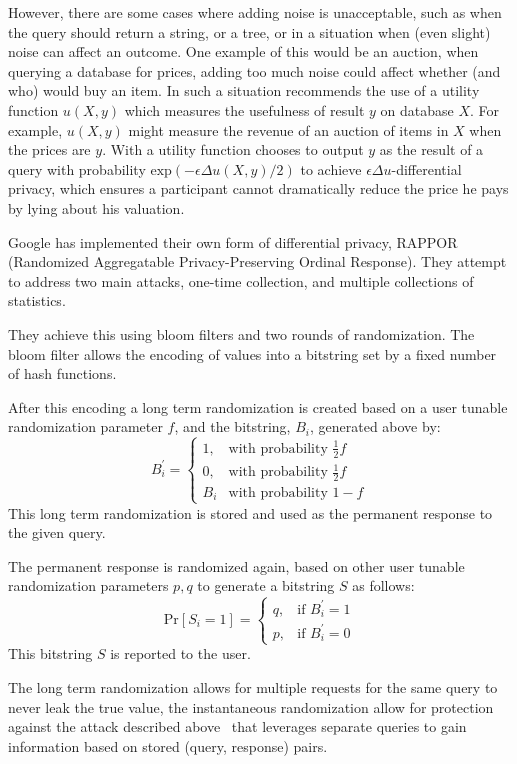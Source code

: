 However, there are some cases where adding noise is unacceptable, such as when
the query should return a string, or a tree, or in a situation when (even
slight) noise can affect an outcome. One example of this would be an auction,
when querying a database for prices, adding too much noise could affect whether
(and who) would buy an item. In such a situation \cite{mcsherry2007mechanism}
recommends the use of a utility function $u(X,y)$ which measures the usefulness
of result $y$ on database $X$. For example, $u(X,y)$ might measure the revenue
of an auction of items in $X$ when the prices are $y$. With a utility function
chooses to output $y$ as the result of a query with probability
$\text{exp}(-\epsilon \Delta u(X,y)/2)$ to achieve $\epsilon\Delta
u$-differential privacy, which ensures a participant cannot dramatically reduce
the price he pays by lying about his valuation.

Google has implemented their own form of differential privacy,
RAPPOR~\cite{erlingsson2014rappor} (Randomized Aggregatable Privacy-Preserving
Ordinal Response). They attempt to address two main attacks, one-time
collection, and multiple collections of statistics. 

They achieve this using bloom filters and two rounds of randomization. The bloom
filter allows the encoding of values into a bitstring set by a fixed number of
hash functions. 

After this encoding a long term randomization is created based
on a user tunable randomization parameter $f$, and the bitstring, $B_i$,
generated above by:
\[
    B^\prime_i = \begin{cases}
        1, & \mbox{with probability } \frac{1}{2} f\\
        0, & \mbox{with probability } \frac{1}{2} f\\
        B_i & \mbox{with probability } 1 - f
    \end{cases}
\]
This long term randomization is stored and used as the permanent response to the
given query.

The permanent response is randomized again, based on other user tunable
randomization parameters $p,q$ to generate a bitstring $S$ as follows:
\[
    \text{Pr}[S_i = 1] = \begin{cases}
        q, &\mbox{if } B^\prime_i = 1\\
        p, &\mbox{if } B^\prime_i = 0
    \end{cases}
\]
This bitstring $S$ is reported to the user.

The long term randomization allows for multiple requests for the same query to
never leak the true value, the instantaneous randomization allow for protection
against the attack described above~\cite{mcsherry2007mechanism} that leverages
separate queries to gain information based on stored (query, response) pairs.

